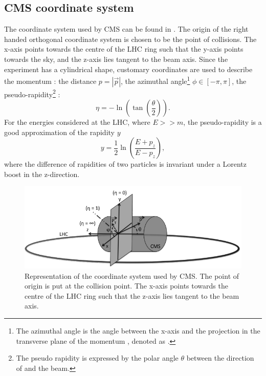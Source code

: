 \subsection{CMS coordinate system}
The coordinate system used by CMS can be found in . The origin of the right handed orthogonal coordinate system is chosen to be the point of collisions. The x-axis points towards the centre of the LHC ring such that the y-axis points towards the sky, and the z-axis lies tangent to the beam axis. Since the experiment has a cylindrical shape, customary coordinates are used to describe the momentum \impuls: the distance $p=|\vec{p}|$, the azimuthal angle\footnote{The azimuthal angle is the angle between the x-axis and the projection in the transverse plane of the momentum \impuls, denoted as \trimpuls. } $\phi \in \left[-\pi,\pi\right]$, the pseudo-rapidity\footnote{The pseudo rapidity  is expressed by the polar angle $\theta$ between the direction of \impuls and the beam.} \psrap: 
\begin{equation}
\eta = - \ln \left(\tan \left(\frac{\theta}{2}\right)\right).
\end{equation}
For the energies considered at the LHC, where $E >> m$, the pseudo-rapidity is a good approximation of the rapidity $y$
\begin{equation}
y = \frac{1}{2} \ln \left(\frac{E + p_z}{E - p_z}\right), 
\end{equation}
where the difference of rapidities of two particles is invariant under a Lorentz boost in the z-direction.
 \begin{figure}[htbp]
	\centering
	\includegraphics[width=1.\textwidth]{2_ExperimentalSetup/Figures/imageedit_1_9146672677}
	\caption{Representation of the coordinate system used by CMS. The point of origin is put at the collision point. The x-axis points towards the centre of the LHC ring such that the z-axis lies tangent to the beam axis. }
	\label{fig:CMScoord}
\end{figure}

